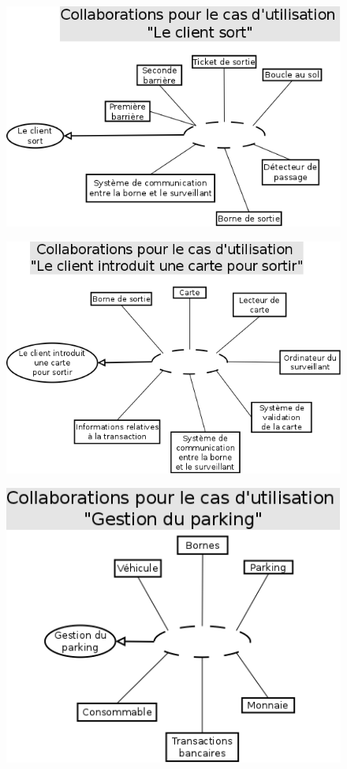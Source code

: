 \documentclass[a4paper]{article}
\begin{document}
\begin{figure}[!ht]
\centering
\includegraphics[scale=.5]{collaborations/_sort.png}
\end{figure}
\begin{figure}[!ht]
\centering
\includegraphics[scale=.5]{collaborations/_carte_sortie.png}
\end{figure}
\begin{figure}[!ht]
\centering
\includegraphics[scale=.5]{collaborations/_gestion_parking.png}
\end{figure}
\end{document}
